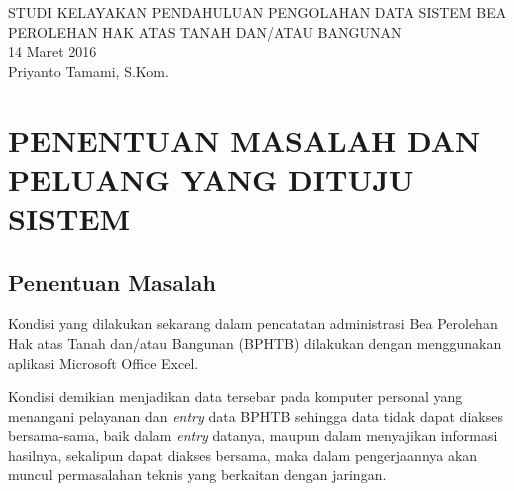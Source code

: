\documentclass[pdftex,12pt, oneside]{article}
\begin{document}
\sloppy

%
\begin{center}
{\large STUDI KELAYAKAN PENDAHULUAN PENGOLAHAN DATA SISTEM BEA PEROLEHAN HAK ATAS TANAH DAN/ATAU BANGUNAN}
\\[1cm]
14 Maret 2016\\
Priyanto Tamami, S.Kom.
\end{center}


%
%

% 


%
%
%
%

%
%
%
% 
% 
% 

%
%


\section{PENENTUAN MASALAH DAN PELUANG YANG DITUJU SISTEM}

\subsection{Penentuan Masalah}

Kondisi yang dilakukan sekarang dalam pencatatan administrasi Bea Perolehan Hak atas Tanah dan/atau Bangunan (BPHTB) dilakukan dengan menggunakan aplikasi Microsoft Office Excel.

Kondisi demikian menjadikan data tersebar pada komputer personal yang menangani pelayanan dan \textit{entry} data BPHTB sehingga data tidak dapat diakses bersama-sama, baik dalam \textit{entry} datanya, maupun dalam menyajikan informasi hasilnya, sekalipun dapat diakses bersama, maka dalam pengerjaannya akan muncul permasalahan teknis yang berkaitan dengan jaringan.
\end{document}
